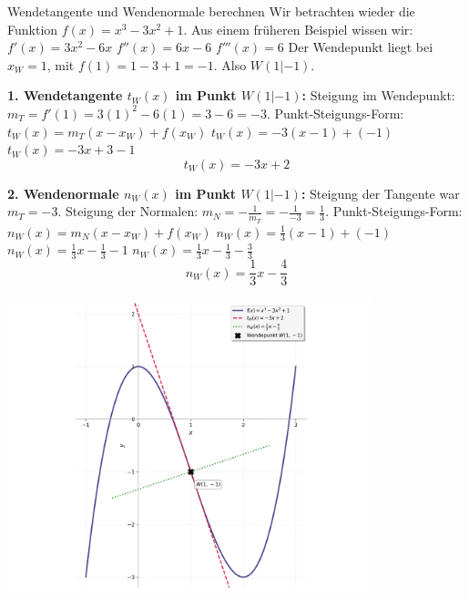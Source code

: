 \begin{beispielumgebung}{Wendetangente und Wendenormale berechnen}
Wir betrachten wieder die Funktion $f(x) = x^3 - 3x^2 + 1$.
Aus einem früheren Beispiel wissen wir:
$f'(x) = 3x^2 - 6x$
$f''(x) = 6x - 6$
$f'''(x) = 6$
Der Wendepunkt liegt bei $x_W=1$, mit $f(1) = 1-3+1 = -1$. Also $W(1|-1)$.

\textbf{1. Wendetangente $t_W(x)$ im Punkt $W(1|-1)$:}
Steigung im Wendepunkt: $m_T = f'(1) = 3(1)^2 - 6(1) = 3 - 6 = -3$.
Punkt-Steigungs-Form: $t_W(x) = m_T (x - x_W) + f(x_W)$
$t_W(x) = -3 (x - 1) + (-1)$
$t_W(x) = -3x + 3 - 1$
\[ t_W(x) = -3x + 2 \]

\textbf{2. Wendenormale $n_W(x)$ im Punkt $W(1|-1)$:}
Steigung der Tangente war $m_T = -3$.
Steigung der Normalen: $m_N = -\frac{1}{m_T} = -\frac{1}{-3} = \frac{1}{3}$.
Punkt-Steigungs-Form: $n_W(x) = m_N (x - x_W) + f(x_W)$
$n_W(x) = \frac{1}{3} (x - 1) + (-1)$
$n_W(x) = \frac{1}{3}x - \frac{1}{3} - 1$
$n_W(x) = \frac{1}{3}x - \frac{1}{3} - \frac{3}{3}$
\[ n_W(x) = \frac{1}{3}x - \frac{4}{3} \]
\begin{center}
    \includegraphics[width=0.8\textwidth]{grafiken/Wendetangente_Normale.png}
    \label{fig:wendetangente_normale}
\end{center}
\end{beispielumgebung}

